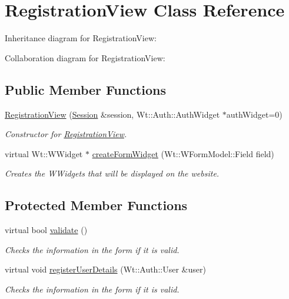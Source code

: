 \hypertarget{classRegistrationView}{}\section{Registration\+View Class Reference}
\label{classRegistrationView}


Inheritance diagram for Registration\+View\+:


Collaboration diagram for Registration\+View\+:
\subsection*{Public Member Functions}
\begin{DoxyCompactItemize}
\item 
\hyperlink{classRegistrationView_a3848c621b2e4176060293f6f80c16fa7}{Registration\+View} (\hyperlink{classSession}{Session} \&session, Wt\+::\+Auth\+::\+Auth\+Widget $\ast$auth\+Widget=0)
\begin{DoxyCompactList}\small\item\em Constructor for \hyperlink{classRegistrationView}{Registration\+View}. \end{DoxyCompactList}\item 
virtual Wt\+::\+W\+Widget $\ast$ \hyperlink{classRegistrationView_ae2a0695f816ba4d0f9845b5da6539b34}{create\+Form\+Widget} (Wt\+::\+W\+Form\+Model\+::\+Field field)
\begin{DoxyCompactList}\small\item\em Creates the W\+Widgets that will be displayed on the website. \end{DoxyCompactList}\end{DoxyCompactItemize}
\subsection*{Protected Member Functions}
\begin{DoxyCompactItemize}
\item 
virtual bool \hyperlink{classRegistrationView_abff4da7c898c36d81a8af6718840d27e}{validate} ()
\begin{DoxyCompactList}\small\item\em Checks the information in the form if it is valid. \end{DoxyCompactList}\item 
virtual void \hyperlink{classRegistrationView_a2e048b6c3103bedacd90a33f6664512b}{register\+User\+Details} (Wt\+::\+Auth\+::\+User \&user)
\begin{DoxyCompactList}\small\item\em Checks the information in the form if it is valid. \end{DoxyCompactList}\end{DoxyCompactItemize}
